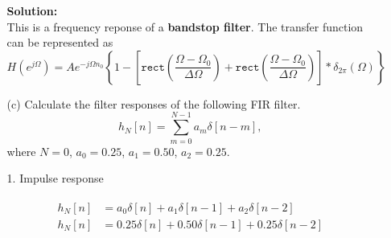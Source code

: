 \documentclass[a4paper, 12pt]{article}
\begin{document}
\begin{itemize}
\begin{itemize}
\textbf{Solution:} \\
This is a frequency reponse of a \textbf{bandstop filter}. The transfer function can be represented as
\begin{equation}
H(e^{j\Omega}) = A e^{-j\Omega n_{0}} \left\lbrace 1 - \left[ \mathtt{rect}\left(\frac{\Omega - \Omega_{0}}{\Delta \Omega} \right) + \mathtt{rect} \left(\frac{\Omega - \Omega_{0}}{\Delta\Omega} \right) \right] \ast \delta_{2 \pi}(\Omega) \right\rbrace
\end{equation}

\pagebreak
\item[(c)]{Calculate the filter responses of the following FIR filter.}
\begin{equation}
h_{N}[n] = \sum_{m=0}^{N-1}{a_{m} \delta[n - m]},
\end{equation}
where $N = 0$, $a_{0} = 0.25$, $a_{1} = 0.50$, $a_{2} = 0.25$.
\end{itemize}

\begin{itemize}
\item[1.]{Impulse response}

\begin{equation}
\begin{gathered}
\begin{alignedat}{1}
h_{N}[n] &= a_{0}\delta[n] + a_{1}\delta[n-1] + a_{2}\delta[n-2] \\
h_{N}[n] &= 0.25\delta[n] + 0.50\delta[n-1] + 0.25\delta[n-2]
\end{alignedat}
\end{gathered}
\end{equation}

\begin{figure}[h!]
\end{figure}


\end{itemize}
\end{itemize}
\end{document}
